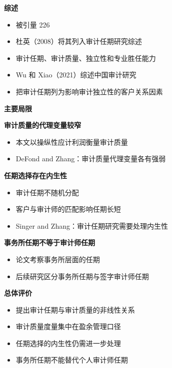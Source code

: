 \documentclass[aspectratio=169,UTF8,zihao=-4]{ctexbeamer}
\newcommand{\bigidea}[1]{
  \begin{center}
    \vspace{0.8em}
    {\LARGE \bfseries #1}
    \vspace{0.6em}
  \end{center}
}
\newcommand{\sectionpageframe}[1]{
  \begin{frame}[plain]
    \begin{center}
      \vfill
      {\Huge \bfseries #1}
      \vfill
    \end{center}
  \end{frame}
}
\begin{document}
\begin{frame}
  \bigidea{综述}
  \begin{itemize}
    \item \Large 被引量 226
    \item \Large 杜英（2008）将其列入审计任期研究综述
    \item \Large 审计任期、审计质量、独立性和专业胜任能力
    \item \Large Wu 和 Xiao（2021）综述中国审计研究
    \item \Large 把审计任期列为影响审计独立性的客户关系因素
  \end{itemize}
\end{frame}

\sectionpageframe{主要局限}

\begin{frame}
  \bigidea{审计质量的代理变量较窄}
  \begin{itemize}
    \item \Large 本文以操纵性应计利润衡量审计质量
    \item \Large DeFond and Zhang：审计质量代理变量各有强弱
  \end{itemize}
\end{frame}

\begin{frame}
  \bigidea{任期选择存在内生性}
  \begin{itemize}
    \item \Large 审计任期不随机分配
    \item \Large 客户与审计师的匹配影响任期长短
    \item \Large Singer and Zhang：审计任期研究需要处理内生性
  \end{itemize}
\end{frame}
\begin{frame}
  \bigidea{事务所任期不等于审计师任期}
  \begin{itemize}
    \item \Large 论文考察事务所层面的任期
    \item \Large 后续研究区分事务所任期与签字审计师任期
  \end{itemize}
\end{frame}

\begin{frame}
  \bigidea{总体评价}
  \begin{itemize}
    \item \Large 提出审计任期与审计质量的非线性关系
    \item \Large 审计质量度量集中在盈余管理口径
    \item \Large 任期选择的内生性仍需进一步处理
    \item \Large 事务所任期不能替代个人审计师任期
  \end{itemize}
\end{frame}
\end{document}
